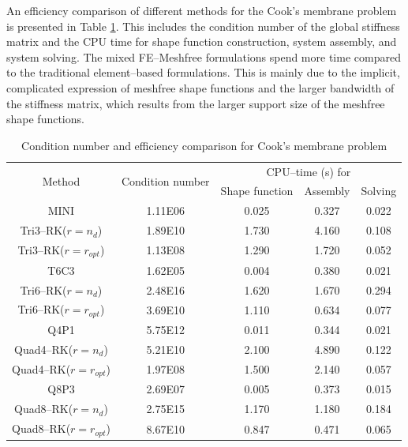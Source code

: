 An efficiency comparison of different methods for the Cook's membrane problem is presented in Table \ref{tab_condition}.
This includes the condition number of the global stiffness matrix and the CPU time for shape function construction, system assembly, and system solving.
The mixed FE--Meshfree formulations spend more time compared to the traditional element--based formulations.
This is mainly due to the implicit, complicated expression of meshfree shape functions and the larger bandwidth of the stiffness matrix, which results from the larger support size of the meshfree shape functions.

\begin{table}[H]
\centering
\caption{Condition number and efficiency comparison for Cook's membrane problem}
\label{tab_condition}
\begin{tabular}{ccccc}
\toprule
\multirow{2}{*}{Method} & \multirow{2}{*}{Condition number} & \multicolumn{3}{c}{CPU--time (s) for} \\
\shortstack{} & \shortstack{} & Shape function & Assembly & Solving \\
\midrule
MINI & 1.11E06 & 0.025 & 0.327 & 0.022 \\
Tri3--RK($r=n_d$) & 1.89E10 & 1.730 & 4.160 & 0.108 \\
Tri3--RK($r=r_{opt}$) & 1.13E08 & 1.290 & 1.720 & 0.052 \\
T6C3 & 1.62E05 & 0.004 & 0.380 & 0.021 \\
Tri6--RK($r=n_d$) & 2.48E16 & 1.620 & 1.670 & 0.294 \\
Tri6--RK($r=r_{opt}$) & 3.69E10 & 1.110 & 0.634 & 0.077 \\
Q4P1 & 5.75E12 & 0.011 & 0.344 & 0.021 \\
Quad4--RK($r=n_d$) & 5.21E10 & 2.100 & 4.890 & 0.122 \\
Quad4--RK($r=r_{opt}$) & 1.97E08 & 1.500 & 2.140 & 0.057 \\
Q8P3 & 2.69E07 & 0.005 & 0.373 & 0.015 \\
Quad8--RK($r=n_d$) & 2.75E15 & 1.170 & 1.180 & 0.184 \\
Quad8--RK($r=r_{opt}$) & 8.67E10 & 0.847 & 0.471 & 0.065 \\
\bottomrule
\end{tabular}
\end{table}
